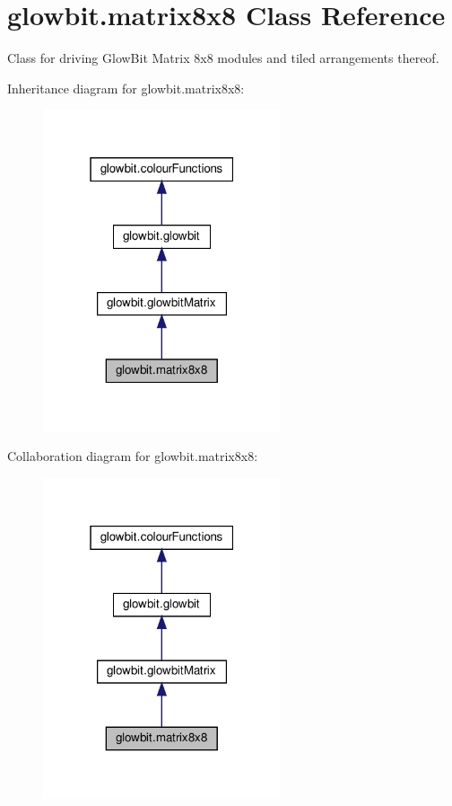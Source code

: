 \hypertarget{classglowbit_1_1matrix8x8}{}\section{glowbit.\+matrix8x8 Class Reference}
\label{classglowbit_1_1matrix8x8}


Class for driving Glow\+Bit Matrix 8x8 modules and tiled arrangements thereof.  




Inheritance diagram for glowbit.\+matrix8x8\+:\nopagebreak
\begin{figure}[H]
\begin{center}
\leavevmode
\includegraphics[width=199pt]{classglowbit_1_1matrix8x8__inherit__graph}
\end{center}
\end{figure}


Collaboration diagram for glowbit.\+matrix8x8\+:\nopagebreak
\begin{figure}[H]
\begin{center}
\leavevmode
\includegraphics[width=199pt]{classglowbit_1_1matrix8x8__coll__graph}
\end{center}
\end{figure}
